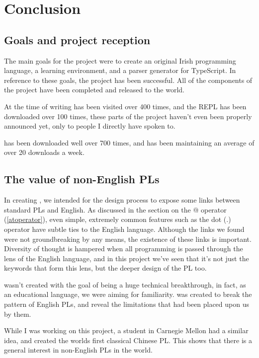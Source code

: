 \chapter{Conclusion}

\section{Goals and project reception}
The main goals for the project were to create an original Irish programming language, a learning environment, and a parser generator for TypeScript. In reference to these goals, the project has been successful. All of the components of the project have been completed and released to the world.

At the time of writing \trys{} has been visited over 400 times, and the \Setanta{} REPL has been downloaded over 100 times, these parts of the project haven't even been properly announced yet, only to people I directly have spoken to.

\tsPEG{} has been downloaded well over 700 times, and has been maintaining an average of over 20 downloads a week.

\section{The value of non-English PLs}

In creating \Setanta{}, we intended for the design process to expose some links between standard PLs and English. As discussed in the section on the @ operator (\ref{atoperator}), even simple, extremely common features such as the dot (.) operator have subtle ties to the English language. Although the links we found were not groundbreaking by any means, the existence of these links is important. Diversity of thought is hampered when all programming is passed through the lens of the English language, and in this project we've seen that it’s not just the keywords that form this lens, but the deeper design of the PL too.

\Setanta{} wasn't created with the goal of being a huge technical breakthrough, in fact, as an educational language, we were aiming for familiarity.
\Setanta{} was created to break the pattern of English PLs, and reveal the limitations that had been placed upon us by them.

While I was working on this project, a student in Carnegie Mellon had a similar idea, and created the worlds first classical Chinese PL\cite{chinesepl}. This shows that there is a general interest in non-English PLs in the world.

